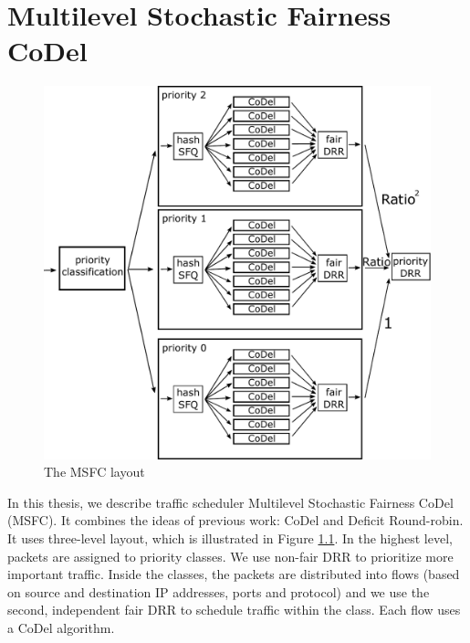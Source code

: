 \chapter{Multilevel Stochastic Fairness CoDel}
\label{chap02}

\begin{figure}
	\centering
	\includegraphics[width=137mm]{drawings/msfc}
	\caption{The MSFC layout}
	\label{fig10:msfc}
\end{figure}

In this thesis, we describe traffic scheduler Multilevel Stochastic Fairness CoDel (MSFC). It combines the ideas of previous work: CoDel and Deficit Round-robin. It uses three-level layout, which is illustrated in Figure \ref{fig10:msfc}. In the highest level, packets are assigned to priority classes. We use non-fair DRR to prioritize more important traffic. Inside the classes, the packets are distributed into flows (based on source and destination IP addresses, ports and protocol) and we use the second, independent fair DRR to schedule traffic within the class. Each flow uses a CoDel algorithm.

